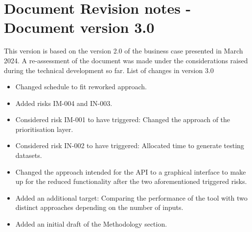 \documentclass[a4paper, 11pt]{report}
\begin{document}
\section{Document Revision notes - Document version 3.0}
This version is based on the version 2.0 of the business case presented in March 2024. A re-assessment of the document was made under the considerations raised during the technical development so far. List of changes in version 3.0
\begin{itemize}
   \item Changed schedule to fit reworked approach.
   \item Added risks IM-004 and IN-003.
   \item Considered risk IM-001 to have triggered: Changed the approach of the prioritisation layer.
   \item Considered risk IN-002 to have triggered: Allocated time to generate testing datasets.
   \item Changed the approach intended for the API to a graphical interface to make up for the reduced functionality after the two aforementioned triggered risks.
   \item Added an additional target: Comparing the performance of the tool with two distinct approaches depending on the number of inputs.
   \item Added an initial draft of the Methodology section.
\end{itemize}
\end{document}
